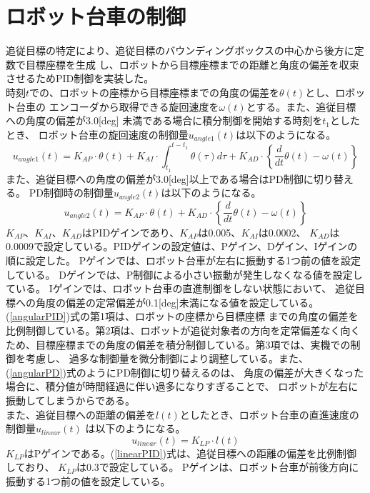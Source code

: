 \section{ロボット台車の制御}
追従目標の特定により、追従目標のバウンディングボックスの中心から後方に定数で目標座標を生成
し、ロボットから目標座標までの距離と角度の偏差を収束させるためPID制御を実装した。 \\ \indent
時刻$t$での、ロボットの座標から目標座標までの角度の偏差を$\theta(t)$とし、ロボット台車の
エンコーダから取得できる旋回速度を$\omega(t)$とする。また、追従目標への角度の偏差が3.0[deg]
未満である場合に積分制御を開始する時刻を$t_1$としたとき、
ロボット台車の旋回速度の制御量$u_{angle1}(t)$は以下のようになる。
\begin{equation}
\label{angularPID}
u_{angle1}(t) = K_{AP} \cdot \theta(t) + K_{AI} \cdot \int_{t_1}^{t-t_1} \theta(\tau) d\tau + K_{AD} \cdot \left\{ \frac{d}{dt} \theta(t) - \omega(t) \right\}
\end{equation}
また、追従目標への角度の偏差が3.0[deg]以上である場合はPD制御に切り替える。
PD制御時の制御量$u_{angle2}(t)$は以下のようになる。
\begin{equation}
\label{angularPD}
u_{angle2}(t) = K_{AP} \cdot \theta(t) + K_{AD} \cdot \left\{ \frac{d}{dt} \theta(t) - \omega(t) \right\}
\end{equation}
$K_{AP}$、$K_{AI}$、$K_{AD}$はPIDゲインであり、$K_{AP}$は0.005、$K_{AI}$は0.0002、
$K_{AD}$は0.0009で設定している。PIDゲインの設定値は、Pゲイン、Dゲイン、Iゲインの順に設定した。
Pゲインでは、ロボット台車が左右に振動する1つ前の値を設定している。
Dゲインでは、P制御による小さい振動が発生しなくなる値を設定している。
Iゲインでは、ロボット台車の直進制御をしない状態において、
追従目標への角度の偏差の定常偏差が0.1[deg]未満になる値を設定している。
(\ref{angularPID})式の第1項は、ロボットの座標から目標座標
までの角度の偏差を比例制御している。第2項は、ロボットが追従対象者の方向を定常偏差なく向く
ため、目標座標までの角度の偏差を積分制御している。第3項では、実機での制御を考慮し、
過多な制御量を微分制御により調整している。また、(\ref{angularPD})式のようにPD制御に切り替えるのは、
角度の偏差が大きくなった場合に、積分値が時間経過に伴い過多になりすぎることで、
ロボットが左右に振動してしまうからである。\\ \indent
また、追従目標への距離の偏差を$l(t)$としたとき、ロボット台車の直進速度の制御量$u_{linear}(t)$
は以下のようになる。
\begin{equation}
\label{linearPID}
u_{linear}(t) = K_{LP} \cdot l(t)
\end{equation}
$K_{LP}$はPゲインである。(\ref{linearPID})式は、追従目標への距離の偏差を比例制御しており、
$K_{LP}$は0.3で設定している。
Pゲインは、ロボット台車が前後方向に振動する1つ前の値を設定している。

